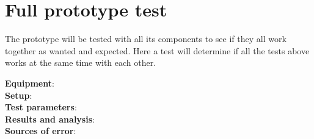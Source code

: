 \section{Full prototype test}
The prototype will be tested with all its components to see if they all work together as wanted and expected. Here a test will determine if all the tests above works at the same time with each other.


\textbf{Equipment}:
\\
\textbf{Setup}:
\\
\textbf{Test parameters}:
\\
\textbf{Results and analysis}:
\\
\textbf{Sources of error}:
